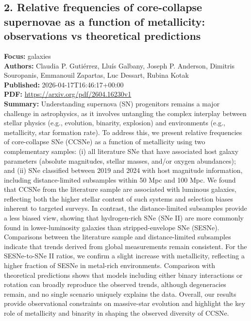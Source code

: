 \documentclass[11pt]{article}
\begin{document}
\subsection*{2. Relative frequencies of core-collapse supernovae as a function of metallicity: observations vs theoretical predictions}
\textbf{Focus:} galaxies\\
\textbf{Authors:} Claudia P. Gutiérrez, Lluís Galbany, Joseph P. Anderson, Dimitris Souropanis, Emmanouil Zapartas, Luc Dessart, Rubina Kotak\\
\textbf{Published:} 2026-04-17T16:46:17+00:00\\
\textbf{PDF:} \href{https://arxiv.org/pdf/2604.16230v1}{https://arxiv.org/pdf/2604.16230v1}\\
\textbf{Summary:}
Understanding supernova (SN) progenitors remains a major challenge in astrophysics, as it involves untangling the complex interplay between stellar physics (e.g., evolution, binarity, explosion) and environments (e.g., metallicity, star formation rate). To address this, we present relative frequencies of core-collapse SNe (CCSNe) as a function of metallicity using two complementary samples: (i) all literature SNe that have associated host galaxy parameters (absolute magnitudes, stellar masses, and/or oxygen abundances); and (ii) SNe classified between 2019 and 2024 with host magnitude information, including distance-limited subsamples within 50 Mpc and 100 Mpc. We found that CCSNe from the literature sample are associated with luminous galaxies, reflecting both the higher stellar content of such systems and selection biases inherent to targeted surveys. In contrast, the distance-limited subsamples provide a less biased view, showing that hydrogen-rich SNe (SNe II) are more commonly found in lower-luminosity galaxies than stripped-envelope SNe (SESNe). Comparisons between the literature sample and distance-limited subsamples indicate that trends derived from global measurements remain consistent. For the SESNe-to-SNe II ratios, we confirm a slight increase with metallicity, reflecting a higher fraction of SESNe in metal-rich environments. Comparison with theoretical predictions shows that models including either binary interactions or rotation can broadly reproduce the observed trends, although degeneracies remain, and no single scenario uniquely explains the data. Overall, our results provide observational constraints on massive-star evolution and highlight the key role of metallicity and binarity in shaping the observed diversity of CCSNe.
\newpage
\end{document}
